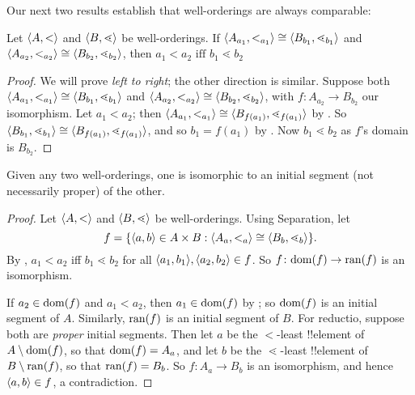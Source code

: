 \documentclass[../../../include/open-logic-section]{subfiles}
\begin{document}
Our next two results establish that well-orderings are always
comparable:

\begin{lem}
Let $\langle A, < \rangle$ and $\langle B, \lessdot \rangle$ be well-orderings. If
$\langle A_{a_1}, <_{a_1} \rangle \cong \langle B_{b_1}, \lessdot_{b_1} \rangle$
and $\langle A_{{a_2}}, <_{a_2} \rangle \cong \langle B_{{b_2}},
\lessdot_{b_2} \rangle$, then ${a_1}  < {a_2} \text{ iff }{b_1} \lessdot
{b_2}$
\end{lem}

\begin{proof}
We will prove \emph{left to right}; the other direction is similar.
Suppose both $\langle A_{a_1}, <_{a_1} \rangle \cong \langle B_{b_1},
\lessdot_{b_1} \rangle$ and $\langle A_{{a_2}},
<_{a_2} \rangle \cong \langle B_{{b_2}}, \lessdot_{b_2} \rangle$, with $f \colon
A_{{a_2}} \to B_{{b_2}}$ our isomorphism. Let ${a_1} < {a_2}$; then
$\langle A_{a_1}, <_{a_1} \rangle \cong \langle B_{f({a_1})},
\lessdot_{f({a_1})} \rangle$ by . So
$\langle B_{b_1}, \lessdot_{b_1} \rangle \cong \langle B_{f({a_1})},
\lessdot_{f({a_1})} \rangle$, and so ${b_1} = f({a_1})$ by
. Now ${b_1} \lessdot {b_2}$ as $f$'s domain
is $B_{{b_2}}$.	
\end{proof}

\begin{thm}
Given any two well-orderings, one is isomorphic to an initial segment
(not necessarily proper) of the other.
\end{thm}

\begin{proof}
Let $\langle A, < \rangle$ and $\langle B, \lessdot \rangle$ be well-orderings. Using
Separation, let
\[
	f = \{ \langle a, b \rangle \in A \times B : 
		\langle A_a, <_a \rangle \cong \langle B_b, \lessdot_b \rangle \}.
\]
By , $a_1 < a_2$ iff $b_1 \lessdot b_2$ for all
$\langle a_1, b_1 \rangle, \langle a_2, b_2 \rangle \in f$. So $f \colon \mathrm{dom}(f) \to
\mathrm{ran}(f)$ is an isomorphism. 

If $a_2 \in \mathrm{dom}(f)$ and $a_1 < a_2$, then $a_1 \in \mathrm{dom}(f)$ by
; so $\mathrm{dom}(f)$ is an initial segment of
$A$. Similarly, $\mathrm{ran}(f)$ is an initial segment of $B$. For reductio,
suppose both are \emph{proper} initial segments. Then let $a$ be the
$<$-least !!{element} of $A \setminus \mathrm{dom}(f)$, so that $\mathrm{dom}(f) =
A_a$, and let $b$ be the $\lessdot$-least !!{element} of $B \setminus
\mathrm{ran}(f)$, so that $\mathrm{ran}(f) = B_b$. So $f \colon A_a \to B_b$ is an
isomorphism, and hence $\langle a, b \rangle \in f$, a contradiction.
\end{proof}
\end{document}
